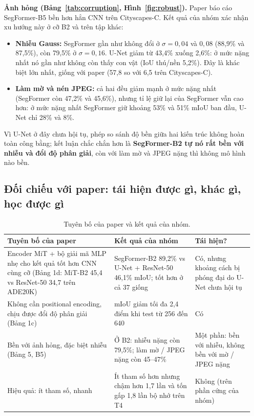 \documentclass[12pt]{article}
\newcommand{\st}[1]{\textbf{#1}}
\begin{document}
\textbf{Ảnh hỏng (Bảng~\ref{tab:corruption}, Hình~\ref{fig:robust}).} Paper báo cáo SegFormer-B5 bền hơn hẳn CNN trên
Cityscapes-C. Kết quả của nhóm xác nhận xu hướng này ở cỡ B2 và trên tập khác:
\begin{itemize}
  \item \st{Nhiễu Gauss:} SegFormer gần như không đổi ở $\sigma = 0{,}04$ và $0{,}08$ (88,9\% và 87,5\%), còn 79,5\% ở
        $\sigma = 0{,}16$. U-Net giảm từ 43,4\% xuống 2,6\%: ở mức nặng nhất nó gần như không còn thấy con vật (IoU thú/nền
        5,2\%). Đây là khác biệt lớn nhất, giống với paper (57,8 so với 6,5 trên Cityscapes-C).
  \item \st{Làm mờ và nén JPEG:} cả hai đều giảm mạnh ở mức nặng nhất (SegFormer còn 47,2\% và 45,6\%), nhưng tỉ lệ giữ lại của
        SegFormer vẫn cao hơn: ở mức nặng nhất SegFormer giữ khoảng 53\% và 51\% mIoU ban đầu, U-Net chỉ 28\% và 8\%.
\end{itemize}
Vì U-Net ở đây chưa hội tụ, phép so sánh độ bền giữa hai kiến trúc không hoàn toàn công bằng; kết luận chắc chắn hơn là
\st{SegFormer-B2 tự nó rất bền với nhiễu và đổi độ phân giải}, còn với làm mờ và JPEG nặng thì không mô hình nào bền.

\subsection{Đối chiếu với paper: tái hiện được gì, khác gì, học được gì}
\begin{table}[H]
\centering
\caption{Tuyên bố của paper và kết quả của nhóm.}\label{tab:compare}
\begin{tabularx}{\linewidth}{@{}P{4.4cm}LP{2.2cm}@{}}
\toprule
Tuyên bố của paper & Kết quả của nhóm & Tái hiện? \\\midrule
Encoder MiT + bộ giải mã MLP nhẹ cho kết quả tốt hơn CNN cùng cỡ (Bảng 1d: MiT-B2 45,4 vs ResNet-50 34,7 trên ADE20K) & SegFormer-B2 89,2\% vs U-Net + ResNet-50 46,1\% mIoU; tốt hơn ở cả 37 giống & Có, nhưng khoảng cách bị phóng đại do U-Net chưa hội tụ \\
Không cần positional encoding, chịu được đổi độ phân giải (Bảng 1c) & mIoU giảm tối đa 2,4 điểm khi test từ 256 đến 640 & Có \\
Bền với ảnh hỏng, đặc biệt nhiễu (Bảng 5, B5) & Ở B2: nhiễu nặng còn 79,5\%; làm mờ / JPEG nặng còn 45--47\% & Một phần: bền với nhiễu, không bền với mờ / JPEG nặng \\
Hiệu quả: ít tham số, nhanh & Ít tham số hơn nhưng chậm hơn 1,7 lần và tốn gấp 1,8 lần bộ nhớ trên T4 & Không (trên phần cứng của nhóm) \\
\bottomrule
\end{tabularx}
\end{table}
\end{document}
